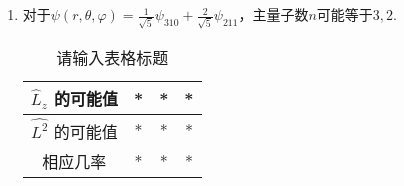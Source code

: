 
\subsection{ }
\begin{enumerate}
\item 对于$\psi(r,\theta,\varphi) = \frac{1}{\sqrt{5}}\psi_{310} + \frac{2}{\sqrt{5}}\psi_{211} $，主量子数$n$可能等于$3,2$.\\
\begin{table}[ht]
\centering
\caption{请输入表格标题}\label{TJU14A_tab1}
\begin{tabular}{|c|c|c|c|}
\hline
$\hat{L}_z$ 的可能值 & * & * & * \\
\hline
$\hat{L^2}$ 的可能值 & * & * & * \\
\hline
相应几率 & * & * & * \\
\hline
\end{tabular}
\end{table}
\end{enumerate}